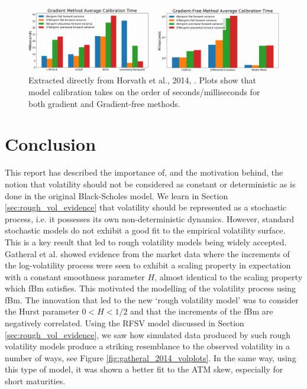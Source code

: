 \documentclass[12pt,oneside]{article}
\begin{document}
 \begin{figure}[htpb]
    \centering
    \includegraphics[width=1.0\textwidth ]{figs/Horvath2019_fig10_11}
    \caption{Extracted directly from Horvath et al., 2014, \cite[Figures~10\&11]{Horvath2019}. Plots show that model calibration takes on the order of seconds/milliseconds for both gradient and Gradient-free methods.}
    \label{fig:Horvath2019_fig10_11} 
\end{figure}

\section{Conclusion}
\label{sec:summary&futurework}
 
This report has described the importance of, and the motivation behind, the notion that volatility should not be considered as constant or deterministic as is done in the original Black-Scholes model. We learn in Section \ref{sec:rough_vol_evidence} that volatility should be represented as a stochastic process, i.e. it possesses its own non-deterministic dynamics. However, standard stochastic models do not exhibit a good fit to the empirical volatility surface. This is a key result that led to rough volatility models being widely accepted.
\\

Gatheral et al. \cite{Gatheral2014} showed evidence from the market data where the increments of the log-volatility process were seen to exhibit a scaling property in expectation with a constant smoothness parameter $H$, almost identical to the scaling property which fBm satisfies. This motivated the modelling of the volatility process using fBm. The innovation that led to the new `rough volatility model' was to consider the Hurst parameter $0<H<1/2$ and that the increments of the fBm are negatively correlated. Using the RFSV model discussed in Section \ref{sec:rough_vol_evidence}, we saw how simulated data produced by such rough volatility models produce a striking resemblance to the observed volatility in a number of ways, see Figure \ref{fig:gatheral_2014_volplots}. In the same way, using this type of model, it was shown a better fit to the ATM skew, especially for short maturities.  
\\
\end{document}
